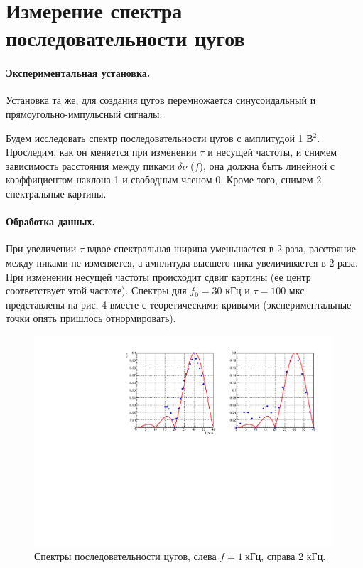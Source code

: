 \documentclass[12pt,a4paper]{article}
\begin{document}
\section{Измерение спектра последовательности цугов}
\paragraph{Экспериментальная установка.} Установка та же, для создания цугов перемножается синусоидальный и прямоугольно-импульсный сигналы.

Будем исследовать спектр последовательности цугов с амплитудой 1 В$^2$. Проследим, как он меняется при изменении $\tau$ и несущей частоты, и снимем зависимость расстояния между пиками $\delta\nu$ ($f$), она должна быть линейной с коэффициентом наклона 1 и свободным членом 0. Кроме того, снимем 2 спектральные картины.
\paragraph{Обработка данных.} При увеличении $\tau$ вдвое спектральная ширина уменьшается в 2 раза, расстояние между пиками не изменяется, а амплитуда высшего пика увеличивается в 2 раза. При изменении несущей частоты происходит сдвиг картины (ее центр соответствует этой частоте). Спектры для $f_0 = 30$ кГц и $\tau = 100$ мкс представлены на рис. 4 вместе с теоретическими кривыми (экспериментальные точки опять пришлось отнормировать).
\begin{figure}[h!]
\centering\includegraphics[width = 0.99\textwidth]{Plot3}
\captionsetup{justification = centering}
\caption{Спектры последовательности цугов, слева $f = 1~\text{кГц}$, справа 2 кГц. \label{Plot3}} 
\end{figure}
\end{document}
